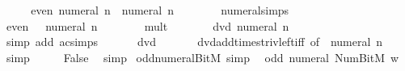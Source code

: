 \begin{isabellebody}
\ \ \isamarkupfalse%
\ \isamarkupfalse%
\ {\isachardoublequoteopen}even\ {\isacharparenleft}{\kern0pt}numeral\ n\ {\isacharplus}{\kern0pt}\ numeral\ n\ {\isacharplus}{\kern0pt}\ {}{\isacharparenright}{\kern0pt}{\isachardoublequoteclose}\isanewline
\ \ \ \ \isamarkupfalse%
\ numeral{\isachardot}{\kern0pt}simps\ \isacommand{{\isachardot}{\kern0pt}}\isamarkupfalse%
\isanewline
\ \ \isamarkupfalse%
\ \isamarkupfalse%
\ {\isachardoublequoteopen}even\ {\isacharparenleft}{\kern0pt}{}\ {\isacharasterisk}{\kern0pt}\ numeral\ n\ {\isacharplus}{\kern0pt}\ {}{\isacharparenright}{\kern0pt}{\isachardoublequoteclose}\isanewline
\ \ \ \ \isamarkupfalse%
\ mult{\isacharunderscore}{\kern0pt}{}\ \isacommand{{\isachardot}{\kern0pt}}\isamarkupfalse%
\isanewline
\ \ \isamarkupfalse%
\ \isamarkupfalse%
\ {\isachardoublequoteopen}{}\ dvd\ numeral\ n\ {\isacharasterisk}{\kern0pt}\ {}\ {\isacharplus}{\kern0pt}\ {}{\isachardoublequoteclose}\isanewline
\ \ \ \ \isamarkupfalse%
\ {\isacharparenleft}{\kern0pt}simp\ add{\isacharcolon}{\kern0pt}\ ac{\isacharunderscore}{\kern0pt}simps{\isacharparenright}{\kern0pt}\isanewline
\ \ \isamarkupfalse%
\ \isamarkupfalse%
\ {\isachardoublequoteopen}{}\ dvd\ {}{\isachardoublequoteclose}\isanewline
\ \ \ \ \isamarkupfalse%
\ dvd{\isacharunderscore}{\kern0pt}add{\isacharunderscore}{\kern0pt}times{\isacharunderscore}{\kern0pt}triv{\isacharunderscore}{\kern0pt}left{\isacharunderscore}{\kern0pt}iff\ {\isacharbrackleft}{\kern0pt}of\ {}\ {\isachardoublequoteopen}numeral\ n{\isachardoublequoteclose}\ {}{\isacharbrackright}{\kern0pt}\ \isamarkupfalse%
\ simp\isanewline
\ \ \isamarkupfalse%
\ \isamarkupfalse%
\ False\ \isamarkupfalse%
\ simp\isanewline
{}\isamarkupfalse%
%
\endisatagproof
{\isafoldproof}%
%
\isadelimproof
\isanewline
%
\endisadelimproof
\isanewline
{}\isamarkupfalse%
\ odd{\isacharunderscore}{\kern0pt}numeral{\isacharunderscore}{\kern0pt}BitM\ {\isacharbrackleft}{\kern0pt}simp{\isacharbrackright}{\kern0pt}{\isacharcolon}{\kern0pt}\isanewline
\ \ {\isacartoucheopen}odd\ {\isacharparenleft}{\kern0pt}numeral\ {\isacharparenleft}{\kern0pt}Num{\isachardot}{\kern0pt}BitM\ w{\isacharparenright}{\kern0pt}{\isacharparenright}{\kern0pt}{\isacartoucheclose}\isanewline

\end{isabellebody}
